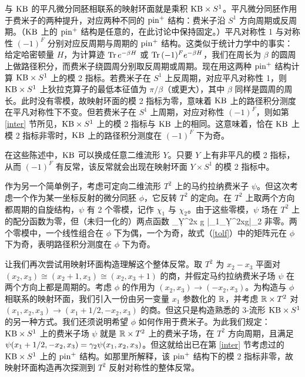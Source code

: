 与 ${\mathrm{KB}}$ 的平凡微分同胚相联系的映射环面就是乘积 ${\mathrm{KB}}\times S^1$。平凡微分同胚作用于费米子的两种提升，对应两种不同的 ${\mathrm{pin}}^+$ 结构：费米子沿 $S^1$ 方向周期或反周期。（${\mathrm{KB}}$ 上的 ${\mathrm{pin}}^+$ 结构是任意的，在此讨论中保持固定。）平凡对称性 1 与对称性 $(-1)^F$ 分别对应反周期与周期的 ${\mathrm{pin}}^+$ 结构。这类似于统计力学中的事实：给定哈密顿量 $H$，为计算迹 ${\rm Tr}\,e^{-\beta H}$ 或 ${\rm Tr}\,(-1)^Fe^{-\beta H}$，我们在周长为 $\beta$ 的圆周上做路径积分，而费米子绕圆周分别取反周期或周期。现在用这两种 ${\mathrm{pin}}^+$ 结构计算 ${\mathrm{KB}}\times S^1$ 上的模 2 指标。若费米子在 $S^1$ 上反周期，对应平凡对称性 1，则 ${\mathrm{KB}}\times S^1$ 上狄拉克算子的最低本征值为 $\pi/\beta$（或更大），其中 $\beta$ 同样是圆周的周长。此时没有零模，故映射环面的模 2 指标为零，意味着 ${\mathrm{KB}}$ 上的路径积分测度在平凡对称性下不变。但若费米子在 $S^1$ 上周期，对应对称性 $(-1)^F$，则如第 \ref{inter} 节所见，${\mathrm{KB}}\times S^1$ 上的模 2 指标与 ${\mathrm{KB}}$ 上的相同。这意味着，恰在 ${\mathrm{KB}}$ 上模 2 指标非零时，${\mathrm{KB}}$ 上的路径积分测度在 $(-1)^F$ 下为奇。


在这些陈述中，${\mathrm{KB}}$ 可以换成任意二维流形 $Y$。只要 $Y$ 上有非平凡的模 2 指标，从而 $(-1)^F$ 有反常，该反常就会出现在映射环面 $Y\times S^1$ 的模 2 指标中。

作为另一个简单例子，考虑可定向二维流形 $T^2$ 上的马约拉纳费米子 $\psi$。但这次考虑一个作为某一坐标反射的微分同胚 $\phi$，它反转 $T^2$ 的定向。在 $T^2$ 上取两个方向都周期的自旋结构，$\psi$ 有 2 个零模，记作 $\chi_1$ 与 $\chi_2$。由于这些零模，$\psi$ 场在 $T^2$ 上的配分函数为零，但（未归一化的）两点函数
\be\label{tolf}\left\langle\int_Y\d^2x \sqrt g \bar\chi_1\psi\cdot \int_Y\d^2x\sqrt g\bar\chi_2\psi\right\rangle\ee
非零。两个零模中，一个线性组合在 $\phi$ 下为偶，一个为奇，故式（\ref{tolf}）中的矩阵元在 $\phi$ 下为奇，表明路径积分测度在 $\phi$ 下为奇。

让我们再次尝试用映射环面构造理解这个整体反常。取 $T^2$ 为 $x_2-x_3$ 平面对 $(x_2,x_3)\cong (x_2+1,x_3)\cong (x_2,x_3+1)$ 的商，并假定马约拉纳费米子场 $\psi$ 在两个方向上都是周期的。考虑 $\phi$ 的作用为 $(x_2,x_3)\to (-x_2,x_3)$。为构造与 $\phi$ 相联系的映射环面，我们引入一份由另一变量 $x_1$ 参数化的 ${\mathbb{R}}$，并考虑 ${\mathbb{R}}\times T^2$ 对 $(x_1,x_2,x_3)\to (x_1+1/2,-x_2,x_3)$ 的商。但这只是构造熟悉的 3-流形 ${\mathrm{KB}}\times S^1$ 的另一种方式。我们还须说明希望 $\phi$ 如何作用于费米子。为此我们规定：${\mathrm{KB}}\times S^1$ 上的费米子场 $\psi $ 就是 ${\mathbb{R}}\times T^2$ 上的费米子场，在 $T^2$ 方向周期，且满足 $\psi(x_1+1/2,-x_2,x_3)={\gamma}_2\psi(x_1,x_2,x_3)$。但这就给出已在第 \ref{inter} 节考虑过的 ${\mathrm{KB}}\times S^1$ 上的 ${\mathrm{pin}}^+$ 结构。如那里所解释，该 ${\mathrm{pin}}^+$ 结构下的模 2 指标非零，故映射环面构造再次探测到 $T^2$ 反射对称性的整体反常。

